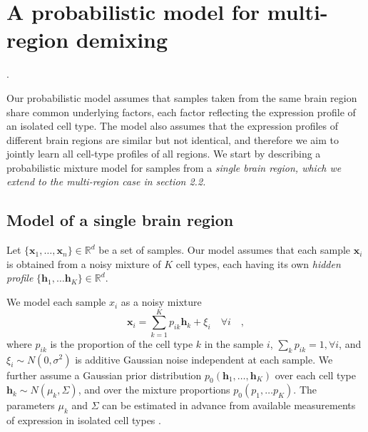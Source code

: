 \documentclass{article} %
\newcommand{\reals}{\mathbb{R}}
\begin{document}

\section{A probabilistic model for multi-region demixing}
\vspace{-10pt}

\newcommand{\x}{\mathbf{x}}
\renewcommand{\c}{\mathbf{h}}
\renewcommand{\H}{{H}}
\newcommand{\Htext}{{C}}
\newcommand{\paren}[1]{\left({#1}\right)}
\newcommand{\brackets}[1]{\left[{#1}\right]}
\newcommand{\norm}[1]{\|{#1}\|}
\newcommand{\argmin}{\operatornamewithlimits{argmin}}.

Our probabilistic model assumes that samples taken from the same brain region share common underlying factors, each factor reflecting the expression profile of an isolated cell type. The model also assumes that the expression profiles of different brain regions are similar but not identical, and therefore we aim to jointly learn all cell-type profiles of all regions. We start by describing a  probabilistic mixture model for samples from a \em{single} brain region, which we extend to the \em{multi-region} case in section 2.2.

\subsection{Model of a single brain region}
Let $\{\x_1, \ldots, \x_n\} \in \reals^d$ be a set of samples. Our model assumes that each sample $\x_i$ is obtained from a noisy mixture of $K$ cell types, each having its own {\em {hidden profile}} $\{\c_1, \ldots \c_K \}\in \reals^d$.

We model each sample $x_i$ as a noisy mixture
\begin{equation*}
 \x_i = \sum_{k=1}^K p_{ik} \c_k + \xi_i \quad\forall i \quad,
\end{equation*}
where $p_{ik}$ is the proportion of the cell type $k$ in the sample $i$, $\sum_k p_{ik} = 1, \forall i$, and $\xi_i \sim N(0,\sigma^2)$ is additive Gaussian noise independent at each sample. We further assume a Gaussian prior distribution $p_0( \c_1, \ldots, \c_K)$ over each cell type $ \c_k  \sim N(\mu_k, \Sigma) $, and over the mixture proportions $p_0(p_1, \ldots p_K)$. The parameters $\mu_k$ and $\Sigma$ can be estimated in advance from available measurements of expression in isolated cell types \cite{okaty2011cell,darmanis2015survey}.
\end{document}
